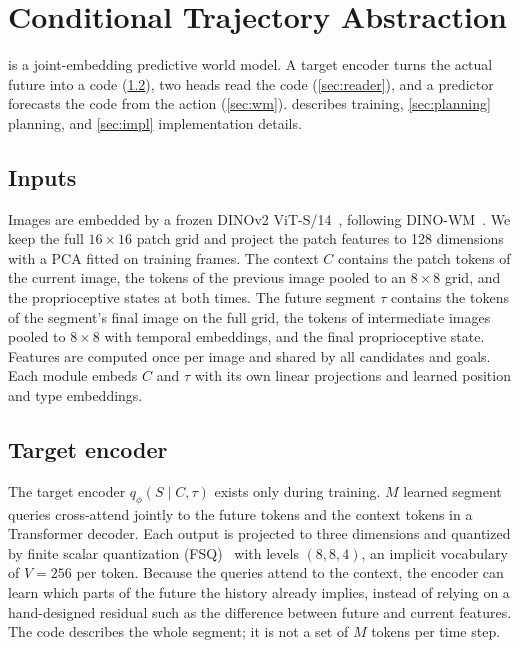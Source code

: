 \section{Conditional Trajectory Abstraction}
\label{sec:method}

\method is a joint-embedding predictive world model.
A target encoder turns the actual future into a code (\cref{sec:source}), two heads read the code (\cref{sec:reader}), and a predictor forecasts the code from the action (\cref{sec:wm}).
 describes training, \cref{sec:planning} planning, and \cref{sec:impl} implementation details.

\subsection{Inputs}
\label{sec:context}
Images are embedded by a frozen DINOv2 ViT-S/14~\cite{oquab2024dinov2}, following DINO-WM~\cite{zhou2025dinowm}.
We keep the full $16{\times}16$ patch grid and project the patch features to 128 dimensions with a PCA fitted on training frames.
The context $C$ contains the patch tokens of the current image, the tokens of the previous image pooled to an $8{\times}8$ grid, and the proprioceptive states at both times.
The future segment $\tau$ contains the tokens of the segment's final image on the full grid, the tokens of intermediate images pooled to $8{\times}8$ with temporal embeddings, and the final proprioceptive state.
Features are computed once per image and shared by all candidates and goals.
Each module embeds $C$ and $\tau$ with its own linear projections and learned position and type embeddings.

\subsection{Target encoder}
\label{sec:source}
The target encoder $q_\phi(S\mid C,\tau)$ exists only during training.
$M$ learned segment queries cross-attend jointly to the future tokens and the context tokens in a Transformer decoder.
Each output is projected to three dimensions and quantized by finite scalar quantization (FSQ)~\cite{mentzer2024fsq} with levels $(8,8,4)$, an implicit vocabulary of $V{=}256$ per token.
Because the queries attend to the context, the encoder can learn which parts of the future the history already implies, instead of relying on a hand-designed residual such as the difference between future and current features.
The code describes the whole segment; it is not a set of $M$ tokens per time step.

